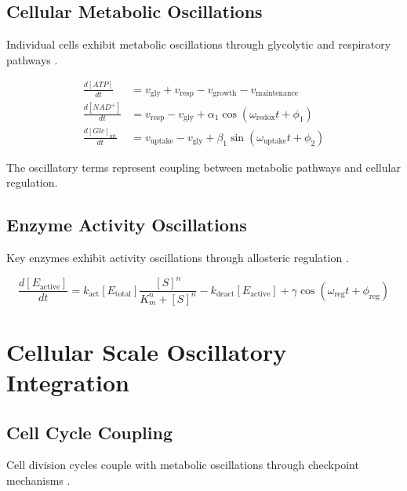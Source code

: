 \documentclass[twocolumn]{article}
\begin{document}
\subsection{Cellular Metabolic Oscillations}

Individual cells exhibit metabolic oscillations through glycolytic and respiratory pathways \citep{danø2001sustained,murray2007temporal}.

\begin{align}
\frac{d[ATP]}{dt} &= v_{\text{gly}} + v_{\text{resp}} - v_{\text{growth}} - v_{\text{maintenance}} \label{eq:atp_balance} \\
\frac{d[NAD^+]}{dt} &= v_{\text{resp}} - v_{\text{gly}} + \alpha_1 \cos(\omega_{\text{redox}}t + \phi_1) \label{eq:nad_oscillation} \\
\frac{d[Glc]_{\text{int}}}{dt} &= v_{\text{uptake}} - v_{\text{gly}} + \beta_1 \sin(\omega_{\text{uptake}}t + \phi_2) \label{eq:glucose_dynamics}
\end{align}

The oscillatory terms represent coupling between metabolic pathways and cellular regulation.

\subsection{Enzyme Activity Oscillations}

Key enzymes exhibit activity oscillations through allosteric regulation \citep{goldbeter1996biochemical}.

\begin{equation}
\frac{d[E_{\text{active}}]}{dt} = k_{\text{act}}[E_{\text{total}}] \frac{[S]^n}{K_m^n + [S]^n} - k_{\text{deact}}[E_{\text{active}}] + \gamma \cos(\omega_{\text{reg}}t + \phi_{\text{reg}})
\label{eq:enzyme_oscillation}
\end{equation}

\section{Cellular Scale Oscillatory Integration}

\subsection{Cell Cycle Coupling}

Cell division cycles couple with metabolic oscillations through checkpoint mechanisms \citep{klevecz1992quantized,lloyd1982ultradian}.
\end{document}

